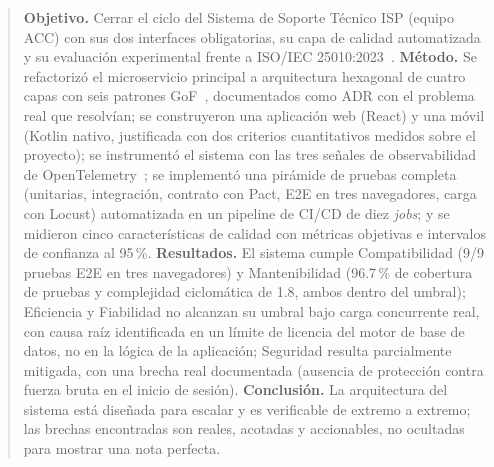 \begin{abstract}
\noindent
\textbf{Objetivo.} Cerrar el ciclo del Sistema de Soporte Técnico ISP (equipo ACC) con sus dos
interfaces obligatorias, su capa de calidad automatizada y su evaluación experimental frente a
ISO/IEC 25010:2023~\cite{iso25010}. \textbf{Método.} Se refactorizó el microservicio principal a
arquitectura hexagonal de cuatro capas con seis patrones GoF~\cite{gamma1994patterns},
documentados como ADR con el problema real que resolvían; se construyeron una aplicación web
(React) y una móvil (Kotlin nativo, justificada con dos criterios cuantitativos medidos sobre el
proyecto); se instrumentó el sistema con las tres señales de observabilidad de
OpenTelemetry~\cite{opentelemetry2024spec}; se implementó una pirámide de pruebas completa
(unitarias, integración, contrato con Pact, E2E en tres navegadores, carga con Locust) automatizada
en un pipeline de CI/CD de diez \emph{jobs}; y se midieron cinco características de calidad con
métricas objetivas e intervalos de confianza al 95\,\%. \textbf{Resultados.} El sistema cumple
Compatibilidad (9/9 pruebas E2E en tres navegadores) y Mantenibilidad (96.7\,\% de cobertura de
pruebas y complejidad ciclomática de 1.8, ambos dentro del umbral); Eficiencia y Fiabilidad no
alcanzan su umbral bajo
carga concurrente real, con causa raíz identificada en un límite de licencia del motor de base de
datos, no en la lógica de la aplicación; Seguridad resulta parcialmente mitigada, con una brecha
real documentada (ausencia de protección contra fuerza bruta en el inicio de sesión).
\textbf{Conclusión.} La arquitectura del sistema está diseñada para escalar y es verificable de
extremo a extremo; las brechas encontradas son reales, acotadas y accionables, no ocultadas para
mostrar una nota perfecta.
\end{abstract}

